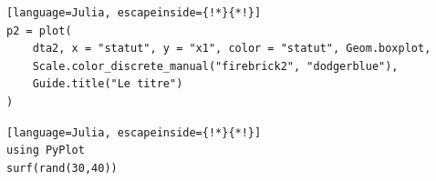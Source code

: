 \begin{frame}[containsverbatim]{}
\begin{lstlisting}[language=Julia, escapeinside={!*}{*!}]
p2 = plot(
    dta2, x = "statut", y = "x1", color = "statut", Geom.boxplot,
    Scale.color_discrete_manual("firebrick2", "dodgerblue"),
    Guide.title("Le titre")
)
\end{lstlisting}
\vspace{-2ex}
\begin{center}
    \begin{figure}
    \end{figure}
\end{center}
\end{frame}

\begin{frame}[containsverbatim]{}
\begin{lstlisting}[language=Julia, escapeinside={!*}{*!}]
using PyPlot
surf(rand(30,40))
\end{lstlisting}
\vspace{-2ex}
\begin{center}
    \begin{figure}
    \end{figure}
\end{center}
\end{frame}


